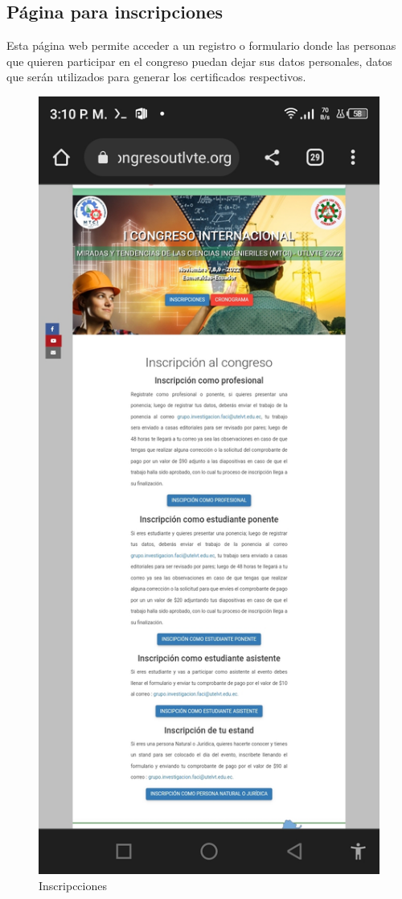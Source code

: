 \documentclass[a4paper,14px]{article}
\begin{document}
\newpage
\subsection{Página para inscripciones }
\label{sec:pagina-principal}

Esta página web permite acceder a un registro o formulario donde las personas que quieren participar en el congreso puedan dejar sus datos personales, datos que serán utilizados para generar los certificados respectivos.



\begin{figure}[H]
  \centering
  \includegraphics[scale=0.3]{inscripcion.jpg}
  \caption{Inscripcciones}
  \label{fig:arquitectura}
\end{figure}
\end{document}
